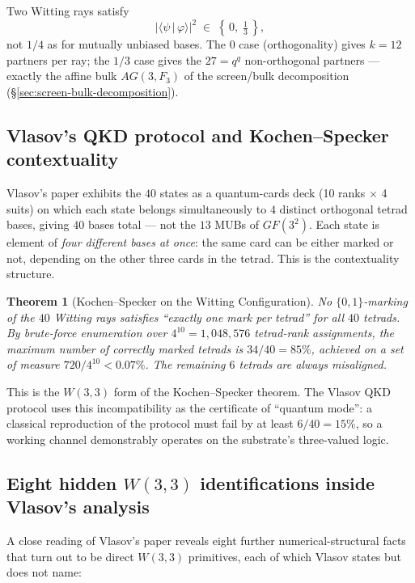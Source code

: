 \documentclass[11pt]{article}
\def\mathbb#1{#1}%
\def\mathrm#1{#1}%
\def\textbf#1{#1}%
\newtheorem*{theorem}{Theorem}
\begin{document}
Two Witting rays satisfy
\[
|\langle\psi\,|\,\varphi\rangle|^2 \;\in\; \left\{\,0,\;\tfrac{1}{3}\,\right\},
\]
not $1/4$ as for mutually unbiased bases. The $0$ case (orthogonality) gives $k = 12$ partners per ray; the $1/3$ case gives the $27 = q^q$ non-orthogonal partners --- exactly the affine bulk $\mathrm{AG}(3, \mathbb{F}_3)$ of the screen/bulk decomposition (\S\ref{sec:screen-bulk-decomposition}).

\subsection*{Vlasov's QKD protocol and Kochen--Specker contextuality}

Vlasov's paper exhibits the $40$ states as a \textbf{quantum-cards deck} (10 ranks $\times$ 4 suits) on which each state belongs simultaneously to $4$ distinct orthogonal tetrad bases, giving $40$ bases total --- not the $13$ MUBs of $\mathrm{GF}(3^2)$. Each state is element of \emph{four different bases at once}: \textbf{the same card can be either marked or not, depending on the other three cards in the tetrad}. This is the contextuality structure.

\begin{theorem}[Kochen--Specker on the Witting Configuration]
No $\{0,1\}$-marking of the $40$ Witting rays satisfies ``exactly one mark per tetrad'' for all $40$ tetrads. By brute-force enumeration over $4^{10} = 1{,}048{,}576$ tetrad-rank assignments, the maximum number of correctly marked tetrads is $34/40 = 85\%$, achieved on a set of measure $720/4^{10} < 0.07\%$. The remaining $6$ tetrads are always misaligned.
\end{theorem}

This is the $W(3,3)$ form of the Kochen--Specker theorem. The Vlasov QKD protocol uses this incompatibility as the certificate of ``quantum mode'': a classical reproduction of the protocol must fail by at least $6/40 = 15\%$, so a working channel demonstrably operates on the substrate's three-valued logic.

\subsection*{Eight hidden $W(3,3)$ identifications inside Vlasov's analysis}

A close reading of Vlasov's paper reveals eight further numerical-structural facts that turn out to be direct $W(3,3)$ primitives, each of which Vlasov states but does not name:
\end{document}

